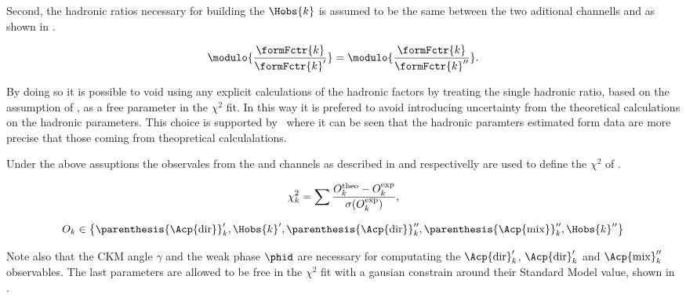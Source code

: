 \noindent Second, the hadronic ratios necessary for building the $\Hobs{k}$ is assumed to be the same between
the two aditional channells \BsJpsiKst and \BdJpsiRho as shown in .

\begin{equation}
  \centering
  \modulo{ \frac{\formFctr{k}}{\formFctr{k}'}  } =
  \modulo{ \frac{\formFctr{k}}{\formFctr{k}''}  }.
  \label{had_ratios_assuption}
\end{equation}

\noindent By doing so it is possible to void using any explicit calculations of the hadronic factors
by treating the single hadronic ratio, based on the assumption of ,
as a free parameter in the $\chi^2$ fit. In this way it is prefered to avoid introducing uncertainty
from the theoretical calculations on the hadronic parameters. This choice is supported by~\cite{DeBruyn-thesis}
where it can be seen that the hadronic paramters estimated form data are more precise that those
coming from theopretical calculalations.

Under the above assuptions the observales from the \BsJpsiKst and \BdJpsiRho channels as described
in  and  respectivelly are used to define the
$\chi^2$ of .

\begin{equation}
  \centering
  \chi^2_k = \sum \frac{O^{\rm theo}_k - O^{\rm exp}_k} {\sigma(O^{\rm exp}_k)},
  \label{chisq_form}
\end{equation}


\begin{equation}
  \centering
  O_k \in \left\{ \parenthesis{\Acp{\rm dir}}'_k, \Hobs{k}', \parenthesis{\Acp{\rm dir}}''_k, \parenthesis{\Acp{\rm mix}}''_k, \Hobs{k}'' \right\}
  \label{chisq_form_with}
\end{equation}

\noindent Note also that the CKM angle $\gamma$ and the weak phase $\phid$ are necessary for computating the ${\Acp{\rm dir}}'_k$,
${\Acp{\rm dir}}'_k$ and ${\Acp{\rm mix}}''_k$ observables. The last parameters are allowed to be free in the
$\chi^2$ fit with a gausian constrain around their Standard Model value, shown in .


